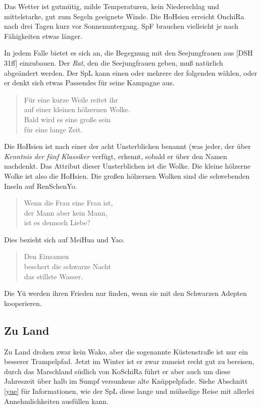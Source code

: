\documentclass[
a4paper,
twoside,
DIV=calc,
BCOR=4mm,
fontsize=9pt,
twocolumn=on,
titlepage=on,
parskip=half
]{scrartcl}
\begin{document}
Das Wetter ist gutmütig, milde Temperaturen, kein Niederschlag und
mittelstarke, gut zum Segeln geeignete Winde. Die HoHsien erreicht
OnchiRa nach drei Tagen kurz vor Sonnenuntergang. SpF brauchen
vielleicht je nach Fähigkeiten etwas länger.

In jedem Falle bietet es sich an, die Begegnung mit den Seejungfrauen
aus [DSH\,31ff] einzubauen. Der \emph{Rat}, den die Seejungfrauen
geben, muß natürlich abgeändert werden. Der SpL kann einen oder mehrere
der folgenden wählen, oder er denkt sich etwas Passendes für seine
Kampagne aus.

\begin{quote}
  Für eine kurze Weile reitet ihr\\
  auf einer kleinen hölzernen Wolke.\\
  Bald wird es eine große sein\\
  für eine lange Zeit.
\end{quote}

Die HoHsien ist nach einer der acht Unsterblichen benannt (was jeder,
der über \emph{Kenntnis der fünf Klassiker} verfügt, erkennt, sobald
er über den Namen nachdenkt. Das Attribut dieser Unsterblichen ist die
Wolke. Die kleine hölzerne Wolke ist also die HoHsien. Die großen
hölzernen Wolken sind die schwebenden Inseln auf RenSchenYo.

\begin{quote}
  Wenn die Frau eine Frau ist,\\
  der Mann aber kein Mann,\\
  ist es dennoch Liebe?
\end{quote}

Dies bezieht sich auf MeiHua und Yao.

\begin{quote}
  Den Einsamen\\
  beschert die schwarze Nacht\\
  das stillste Wasser.
\end{quote}

Die Yü werden ihren Frieden nur finden, wenn sie mit den Schwarzen
Adepten kooperieren.

\subsection{Zu Land}

Zu Land drohen zwar kein Wako, aber die sogenannte Küstenstraße ist
nur ein besserer Trampelpfad. Jetzt im Winter ist er zwar zumeist
recht gut zu bereisen, durch das Marschland südlich von KoSchiRa führt
er aber auch um diese Jahreszeit über halb im Sumpf versunkene alte
Knüppelpfade. Siehe Abschnitt \ref{yue} für Informationen, wie der SpL
diese lange und mühselige Reise mit allerlei Annehmlichkeiten
ausfüllen kann.
\end{document}
